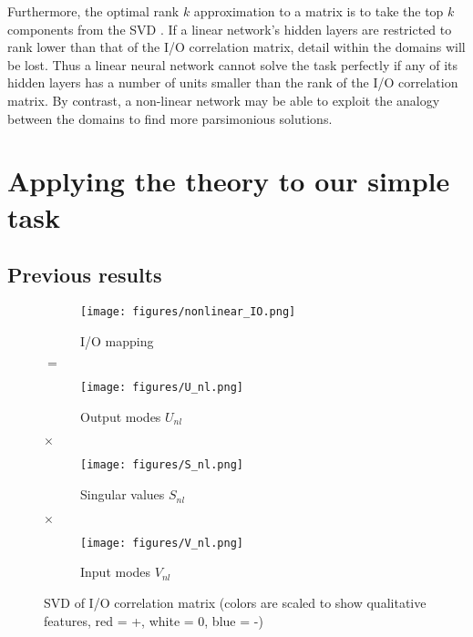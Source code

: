 \documentclass[11pt]{article}
\begin{document}
Furthermore, the optimal rank $k$ approximation to a matrix is to take the top $k$ components from the SVD \citep{Mirsky1960}. If a linear network's hidden layers are restricted to rank lower than that of the I/O correlation matrix, detail within the domains will be lost. Thus a linear neural network cannot solve the task perfectly if any of its hidden layers has a number of units smaller than the rank of the I/O correlation matrix. By contrast, a non-linear network may be able to exploit the analogy between the domains to find more parsimonious solutions.  
\section{Applying the theory to our simple task}
\subsection{Previous results}
\begin{figure}
\centering
\begin{subfigure}{0.22\textwidth}
\texttt{[image: figures/nonlinear\_IO.png]}
\caption{I/O mapping}
\label{nonlinear_IO_sub}
\end{subfigure}
\hspace{-0.25em}\LARGE{$=$}\hspace{-0.25em}
\begin{subfigure}{0.22\textwidth}
\texttt{[image: figures/U\_nl.png]}
\caption{Output modes $U_{nl}$}
\end{subfigure}
\hspace{-0.25em}\LARGE{$\times$}\hspace{-0.25em}
\begin{subfigure}{0.22\textwidth}
\texttt{[image: figures/S\_nl.png]}
\caption{Singular values $S_{nl}$}
\end{subfigure}
\hspace{-0.25em}\LARGE{$\times$}\hspace{-0.25em}
\begin{subfigure}{0.22\textwidth}
\texttt{[image: figures/V\_nl.png]}
\caption{Input modes $V_{nl}$}
\end{subfigure}
\caption{SVD of I/O correlation matrix (colors are scaled to show qualitative features, red = +, white = 0, blue = -)}
\label{regular_SVD_figure}
\end{figure}
\end{document}
